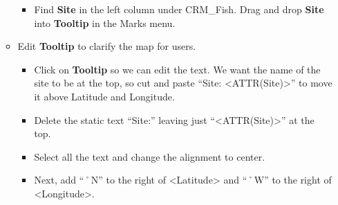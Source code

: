 \documentclass[
]{book}
\providecommand{\tightlist}{%
  \setlength{\itemsep}{0pt}\setlength{\parskip}{0pt}}
\begin{document}
\begin{enumerate}
\begin{itemize}
    \begin{itemize}
    \tightlist
    \item
      Find \textbf{Site} in the left column under CRM\_Fish. Drag and drop \textbf{Site} into \textbf{Tooltip} in the Marks menu.
    \end{itemize}
  \item
    Edit \textbf{Tooltip} to clarify the map for users.

    \begin{itemize}
    \tightlist
    \item
      Click on \textbf{Tooltip} so we can edit the text. We want the name of the site to be at the top, so cut and paste ``Site: \textless ATTR(Site)\textgreater{}'' to move it above Latitude and Longitude.
    \item
      Delete the static text ``Site:'' leaving just ``\textless ATTR(Site)\textgreater{}'' at the top.
    \item
      Select all the text and change the alignment to center.
    \item
      Next, add ``˚N'' to the right of \textless Latitude\textgreater{} and ``˚W'' to the right of \textless Longitude\textgreater.


\end{itemize}
\end{itemize}
\end{enumerate}
\end{document}

